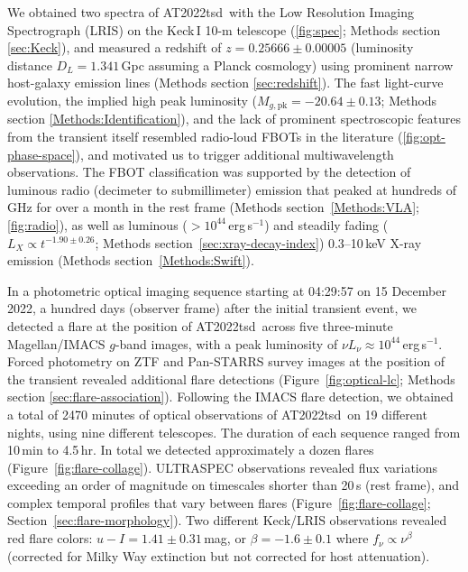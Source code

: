 \documentclass{nature_plusfigure}
\newcommand{\at}{AT2022tsd}
\begin{document}
We obtained two spectra of \at\ with the Low Resolution Imaging Spectrograph (LRIS\cite{Oke1995}) on the Keck\,I 10-m telescope (\ref{fig:spec}; Methods section \ref{sec:Keck}), and measured\cite{Ho2022_Astronote_Keck} a redshift of $z=0.25666\pm0.00005$ (luminosity distance $D_L=1.341\,$Gpc assuming a Planck cosmology\cite{Planck2020}) using prominent narrow host-galaxy emission lines (Methods section \ref{sec:redshift}). 
The fast light-curve evolution, the implied high peak luminosity ($M_{g,\mathrm{pk}}=-20.64\pm0.13$; Methods section \ref{Methods:Identification}), and the lack of prominent spectroscopic features from the transient itself resembled radio-loud FBOTs in the literature\cite{Prentice2018,Ho2020_Koala,Perley2019,Perley2021,Yao2022} (\ref{fig:opt-phase-space}), and motivated us to trigger additional multiwavelength observations.
The FBOT classification was supported by the detection of luminous radio (decimeter\cite{Ho2022Astronote_radio} to submillimeter) emission that peaked at hundreds of GHz for over a month in the rest frame (Methods section~\ref{Methods:VLA}; \ref{fig:radio}),
as well as luminous ($>10^{44}\,$erg\,s$^{-1}$) and steadily fading ($L_X\propto t^{-1.90\pm0.26}$; Methods section~\ref{sec:xray-decay-index}) 0.3--10\,keV X-ray emission\cite{Schulze2022Astronote_xray} (Methods section~\ref{Methods:Swift}).

In a photometric optical imaging sequence starting at 04:29:57 on 15 December 2022, a hundred days (observer frame) after the initial transient event, we detected\cite{Ho2022_Astronote_Flares} a flare at the position of \at\ across five three-minute Magellan/IMACS $g$-band images, with a peak luminosity of $\nu L_\nu \approx 10^{44}\,$erg\,s$^{-1}$.
Forced photometry on ZTF and Pan-STARRS survey images at the position of the transient revealed additional flare detections (Figure~\ref{fig:optical-lc}; Methods section \ref{sec:flare-association}).
Following the IMACS flare detection, we obtained a total of 2470 minutes of optical observations of \at\ on 19 different nights, using nine different telescopes. The duration of each sequence ranged from 10\,min to 4.5\,hr. In total we detected approximately a dozen flares (Figure~\ref{fig:flare-collage}). ULTRASPEC observations revealed flux variations exceeding an order of magnitude on timescales shorter than 20\,s (rest frame), and complex temporal profiles that vary between flares (Figure~\ref{fig:flare-collage}; Section~\ref{sec:flare-morphology}).
Two different Keck/LRIS observations revealed red flare colors:
$u-I=1.41\pm0.31\,$mag, or $\beta=-1.6\pm0.1$ where
$f_\nu \propto \nu^{\beta}$ (corrected for Milky Way extinction but not corrected for host attenuation).
\end{document}
